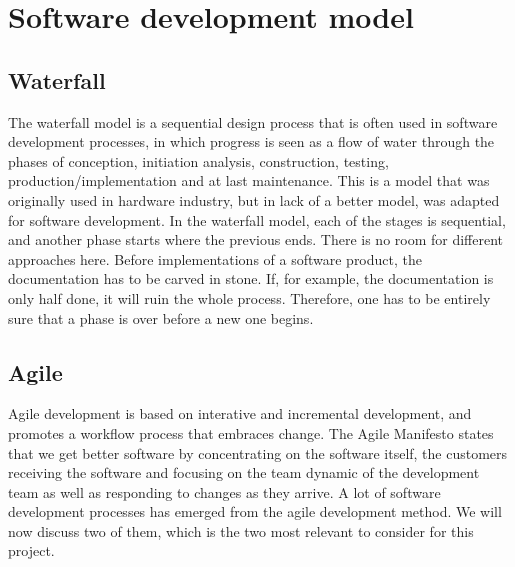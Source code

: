 \section{Software development model}

\subsection{Waterfall}
The waterfall model is a sequential design process that is often used in software development processes, in which progress is seen as a flow of water through the phases of conception, initiation analysis, construction, testing, production/implementation and at last maintenance\cite{bib:waterfall}. 
\newline
\newline
This is a model that was originally used in hardware industry, but in lack of a better model, was adapted for software development. In the waterfall model, each of the stages is sequential, and another phase starts where the previous ends. There is no room for different approaches here. Before implementations of a software product, the documentation has to be carved in stone. If, for example, the documentation is only half done, it will ruin the whole process. Therefore, one has to be entirely sure that a phase is over before a new one begins. 

\subsection{Agile}
Agile development is based on interative and incremental development, and promotes a workflow process that embraces change\cite{bib:agile}. The Agile Manifesto states that we get better software by concentrating on the software itself, the customers receiving the software and focusing on the team dynamic of the development team as well as responding to changes as they arrive. A lot of software development processes has emerged from the agile development method. We will now discuss two of them, which is the two most relevant to consider for this project. 

